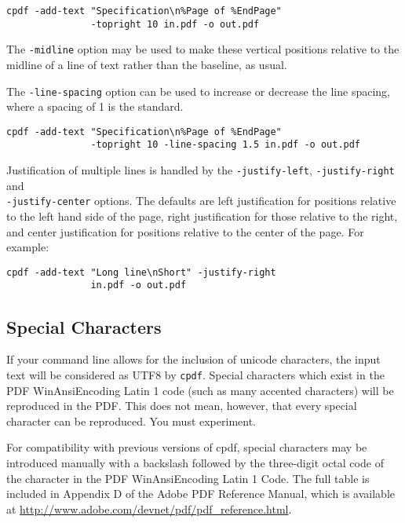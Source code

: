 \documentclass{book}
\begin{document}
  \begin{framed}
    \small\begin{verbatim}cpdf -add-text "Specification\n%Page of %EndPage"
               -topright 10 in.pdf -o out.pdf\end{verbatim}
  \end{framed}

\noindent The \texttt{-midline} option may be used to make these vertical positions
relative to the midline of a line of text rather than the baseline, as usual.

The \texttt{-line-spacing} option can be used to increase or decrease the line
spacing, where a spacing of 1 is the standard.

  \begin{framed}
    \small\begin{verbatim}cpdf -add-text "Specification\n%Page of %EndPage"
               -topright 10 -line-spacing 1.5 in.pdf -o out.pdf\end{verbatim}
  \end{framed}

\noindent Justification of multiple lines is handled by the \texttt{-justify-left}, 
\texttt{-justify-right} and\\ \texttt{-justify-center} options. The defaults are
left justification for positions relative to the left hand side of the page,
right justification for those relative to the right, and center justification
for positions relative to the center of the page. For example:

\begin{framed}
  \small\begin{verbatim}cpdf -add-text "Long line\nShort" -justify-right
               in.pdf -o out.pdf\end{verbatim}
\end{framed}

\subsection{Special Characters}

If your command line allows for the inclusion of unicode characters, the input
text will be considered as UTF8 by \verb!cpdf!. Special characters which exist
in the PDF WinAnsiEncoding Latin 1 code (such as many accented characters) will
be reproduced in the PDF. This does not mean, however, that every special
character can be reproduced. You must experiment.

For compatibility with previous versions of cpdf, special characters may be
introduced manually with a backslash followed by the three-digit octal code of
the character in the PDF WinAnsiEncoding Latin 1 Code. The full table is
included in Appendix D of the Adobe PDF Reference Manual, which is available at
\url{http://www.adobe.com/devnet/pdf/pdf_reference.html}.
\end{document}
